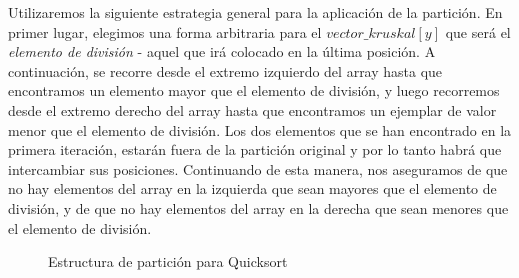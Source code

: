 Utilizaremos la siguiente estrategia general para la aplicación de la partición. En primer lugar, elegimos una forma arbitraria para el $vector\_kruskal[y]$ que será el \emph{elemento de división} - aquel que irá colocado en la última posición. A continuación, se recorre desde el extremo izquierdo del array hasta que encontramos un elemento mayor que el elemento de división, y luego recorremos desde el extremo derecho del array hasta que encontramos un ejemplar de valor menor que el elemento de división. Los dos elementos que se han encontrado en la primera iteración, estarán fuera de la partición original y por lo tanto habrá que intercambiar sus posiciones. Continuando de esta manera, nos aseguramos de que no hay elementos del array en la izquierda que sean mayores que el elemento de división, y de que no hay elementos del array en la derecha que sean menores que el elemento de división. \\

\begin{center}%
\begin{figure}[H]%
\begin{minipage}[H]{1\columnwidth}%
\centering%
\caption{Estructura de partición para Quicksort}%
\end{minipage}%
\end{figure}%
\end{center}%

